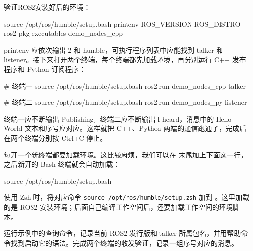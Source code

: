 \begin{example}
验证ROS2安装好后的环境：
\par\medskip\noindent\begin{minipage}{\linewidth}
\begin{tbash}
source /opt/ros/humble/setup.bash
printenv ROS_VERSION ROS_DISTRO
ros2 pkg executables demo_nodes_cpp
\end{tbash}
\end{minipage}\par\smallskip
printenv 应依次输出 2 和 humble，可执行程序列表中应能找到 talker 和 listener。接下来打开两个终端，每个终端都先加载环境，再分别运行 C++ 发布程序和 Python 订阅程序：
\par\medskip\noindent\begin{minipage}{\linewidth}
\begin{tbash}
# 终端一
source /opt/ros/humble/setup.bash
ros2 run demo_nodes_cpp talker
\end{tbash}
\end{minipage}\par\smallskip
\par\medskip\noindent\begin{minipage}{\linewidth}
\begin{tbash}
# 终端二
source /opt/ros/humble/setup.bash
ros2 run demo_nodes_py listener
\end{tbash}
\end{minipage}\par\smallskip
终端一应不断输出 Publishing，终端二应不断输出 I heard，消息中的 Hello World 文本和序号应对应。这样就把 C++、Python 两端的通信跑通了，完成后在两个终端分别按 Ctrl+C 停止。

每开一个新终端都要加载环境。这比较麻烦，我们可以在  末尾加上下面这一行，之后新开的 Bash 终端就会自动加载：
\par\medskip\noindent\begin{minipage}{\linewidth}
\begin{tbash}
source /opt/ros/humble/setup.bash
\end{tbash}
\end{minipage}\par\smallskip
使用 Zsh 时，将对应命令 \texttt{source /opt/ros/humble/setup.zsh} 加到 。这里加载的是 ROS2 安装环境；后面自己编译工作空间后，还要加载工作空间的环境脚本。
\end{example}
\begin{exercise}
\label{ex:v2-ros-setup}
运行示例中的查询命令，记录当前 ROS2 发行版和 talker 所属包名，并用帮助命令找到启动它的语法。完成两个终端的收发验证，记录一组序号对应的消息。
\end{exercise}

